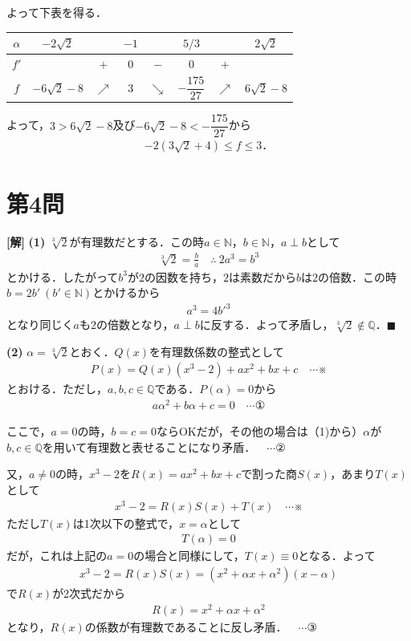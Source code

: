 \documentclass[../main.tex]{subfiles}
\begin{document}
よって下表を得る．

\begin{center}
  \begin{tabular}{c|ccccccc}
    $\alpha$ & $-2\sqrt2$ & & $-1$ & & $5/3$ & & $2\sqrt2$ \\
    \hline
    $f'$ & & $+$ & $0$ & $-$ & $0$ & $+$ & \\
    \hline
    $f$ & $-6\sqrt2-8$ & $\nearrow$ & $3$ & $\searrow$ & $-\dfrac{175}{27}$ & $\nearrow$ & $6\sqrt2-8$ \\
  \end{tabular}
\end{center}

よって，$3>6\sqrt2-8$及び$-6\sqrt2-8<-\dfrac{175}{27}$から
\begin{align*}
  -2(3\sqrt2+4)\le f\le3．
\end{align*}

\newpage

\section*{第4問}

{\bf [解]}
\textbf{(1)} $\sqrt[3]2$が有理数だとする．この時$a\in\mathbb N$，$b\in\mathbb N$，$a\perp b$として
\begin{align*}
  \sqrt[3]2=\frac ba\quad\therefore\ 2a^3=b^3
\end{align*}
とかける．したがって$b^3$が$2$の因数を持ち，$2$は素数だから$b$は$2$の倍数．この時$b=2b'\ (b'\in\mathbb N)$とかけるから
\begin{align*}
  a^3=4b'^3
\end{align*}
となり同じく$a$も$2$の倍数となり，$a\perp b$に反する．よって矛盾し，$\sqrt[3]2\notin\mathbb Q$．$\blacksquare$

\textbf{(2)} $\alpha=\sqrt[3]2$とおく．$Q(x)$を有理数係数の整式として
\begin{align*}
  P(x)=Q(x)(x^3-2)+ax^2+bx+c\quad\cdots\text{※}
\end{align*}
とおける．ただし，$a,b,c\in\mathbb{Q}$である．$P(\alpha)=0$から
\begin{align*}
  a\alpha^2+b\alpha+c=0\quad\cdots①
\end{align*}

ここで，$a=0$の時，$b=c=0$ならOKだが，その他の場合は（1)から）$\alpha$が$b,c\in\mathbb Q$を用いて有理数と表せることになり矛盾．$\quad\cdots②$

又，$a\ne0$の時，$x^3-2$を$R(x)=ax^2+bx+c$で割った商$S(x)$，あまり$T(x)$として
\begin{align*}
x^3-2=R(x)S(x)+T(x)\quad\cdots\text{※}
\end{align*}
ただし$T(x)$は1次以下の整式で，$x=\alpha$として
\begin{align*}
T(\alpha)=0
\end{align*}
だが，これは上記の$a=0$の場合と同様にして，$T(x)\equiv0$となる．よって
\begin{align*}
x^3-2=R(x)S(x)=(x^2+\alpha x+\alpha^2)(x-\alpha)
\end{align*}
で$R(x)$が2次式だから
\begin{align*}
R(x)=x^2+\alpha x+\alpha^2
\end{align*}
となり，$R(x)$の係数が有理数であることに反し矛盾．$\quad\cdots③$
\end{document}
